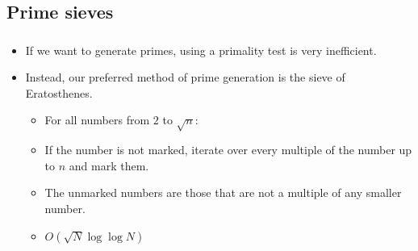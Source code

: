 \documentclass[10pt]{beamer}
\newcommand{\bi}{\begin{itemize}}
\newcommand{\ei}{\end{itemize}}
\begin{document}
\subsection{Prime sieves}
\begin{frame}[fragile]
  \frametitle{\insertsubsection}
  \bi
    \item If we want to generate primes, using a primality test is very inefficient.
    \item Instead, our preferred method of prime generation is the sieve of Eratosthenes.
      \bi
        \item For all numbers from $2$ to $\sqrt{n}$:
        \item If the number is not marked, iterate over every multiple of the
          number up to $n$ and mark them.
        \item The unmarked numbers are those that are not a multiple of any
          smaller number.
        \item $O(\sqrt{N}\log \log N)$
      \ei
  \ei
  \begin{columns}[T]
    \begin{column}{.7\textwidth}
      \centering



\end{column}
\end{columns}
\end{frame}
\end{document}
